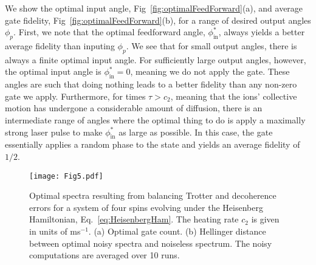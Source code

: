 \documentclass[prx,aps,twocolumn,showpacs,superscriptaddress,10pt]{revtex4-1}
\begin{document}
We show the optimal input angle, Fig~\ref{fig:optimalFeedForward}(a), and average gate fidelity, Fig~\ref{fig:optimalFeedForward}(b), for a range of desired output angles $\phi_{p}$. First, we note that the optimal feedforward angle, $\phi_\textrm{in}^{*}$, always yields a better average fidelity than inputing $\phi_{p}$. We see that for small output angles, there is always a finite optimal input angle. For sufficiently large output angles, however, the optimal input angle is $\phi_\textrm{in}^{*}=0$, meaning we do not apply the gate. These angles are such that doing nothing leads to a better fidelity than any non-zero gate we apply. Furthermore, for times $\tau>c_{2}$, meaning that the ions' collective motion has undergone a considerable amount of diffusion, there is an intermediate range of angles where the optimal thing to do is apply a maximally strong laser pulse to make $\phi_\textrm{in}^{*}$ as large as possible. In this case, the gate essentially applies a random phase to the state and yields an average fidelity of $1/2$. 


\begin{figure*}[t!]
	\centering
	\texttt{[image: Fig5.pdf]}
	\caption{Optimal spectra resulting from balancing Trotter and decoherence errors for a system of four spins evolving under the Heisenberg Hamiltonian, Eq.~\eqref{eq:HeisenbergHam}. The heating rate $c_{2}$ is given in units of ms$^{-1}$. (a) Optimal gate count. (b) Hellinger distance between optimal noisy spectra and noiseless spectrum. The noisy computations are averaged over 10 runs.}
	\label{fig:optimalSpectrum}
\end{figure*}
\end{document}

